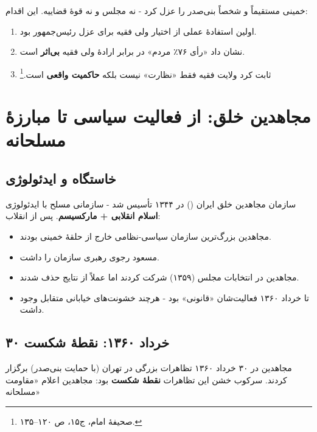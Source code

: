 \documentclass[12pt,a4paper]{book}
\newcommand{\keyword}[1]{\textbf{\textcolor{cPrimary}{#1}}}
\newcommand{\en}[1]{\lr{\textit{#1}}}
\begin{document}
\begin{warningBox}
خمینی مستقیماً و شخصاً بنی‌صدر را عزل کرد - نه مجلس و نه قوهٔ قضاییه. این اقدام:
\begin{enumerate}[label=\textcolor{cAccent}{\bfseries\arabic*.}, rightmargin=2em]
    \item اولین استفادهٔ عملی از اختیار ولی فقیه برای عزل رئیس‌جمهور بود.
    \item نشان داد «رأی ۷۶٪ مردم» در برابر ارادهٔ ولی فقیه \keyword{بی‌اثر} است.
    \item ثابت کرد ولایت فقیه فقط «نظارت» نیست بلکه \keyword{حاکمیت واقعی} است.\footnote{صحیفهٔ امام، ج۱۵، ص ۱۲۰–۱۳۵.}
\end{enumerate}
\end{warningBox}

\section{مجاهدین خلق: از فعالیت سیاسی تا مبارزهٔ مسلحانه}

\subsection{خاستگاه و ایدئولوژی}

سازمان مجاهدین خلق ایران (\en{MEK/PMOI}) در ۱۳۴۴ تأسیس شد - سازمانی مسلح با ایدئولوژی \keyword{اسلام انقلابی + مارکسیسم}. پس از انقلاب:

\begin{itemize}[label=\textcolor{cPrimary}{$\blacktriangleright$}, rightmargin=2em]
    \item مجاهدین بزرگ‌ترین سازمان سیاسی-نظامی خارج از حلقهٔ خمینی بودند.
    \item مسعود رجوی رهبری سازمان را داشت.
    \item مجاهدین در انتخابات مجلس (۱۳۵۹) شرکت کردند اما عملاً از نتایج حذف شدند.
    \item تا خرداد ۱۳۶۰ فعالیت‌شان «قانونی» بود - هرچند خشونت‌های خیابانی متقابل وجود داشت.
\end{itemize}

\subsection{۳۰ خرداد ۱۳۶۰: نقطهٔ شکست}

مجاهدین در ۳۰ خرداد ۱۳۶۰ تظاهرات بزرگی در تهران (با حمایت بنی‌صدر) برگزار کردند. سرکوب خشن این تظاهرات \keyword{نقطهٔ شکست} بود: مجاهدین اعلام «مقاومت مسلحانه»
\end{document}
